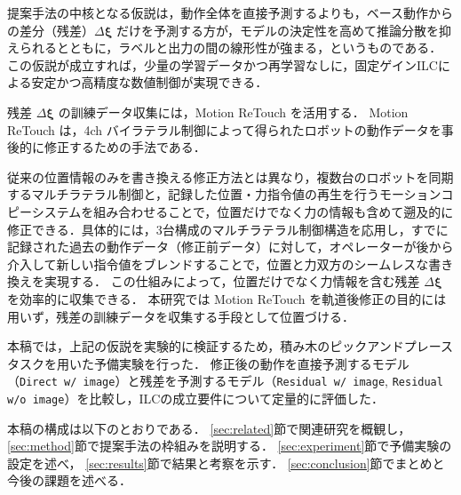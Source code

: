 提案手法の中核となる仮説は，動作全体を直接予測するよりも，ベース動作からの差分（残差）$\Delta\bm{\xi}$ だけを予測する方が，モデルの決定性を高めて推論分散を抑えられるとともに，ラベルと出力の間の線形性が強まる，というものである．
この仮説が成立すれば，少量の学習データかつ再学習なしに，固定ゲインILCによる安定かつ高精度な数値制御が実現できる．

残差 $\Delta\bm{\xi}$ の訓練データ収集には，Motion ReTouch \cite{Inami2025} を活用する．
Motion ReTouch は，4ch バイラテラル制御によって得られたロボットの動作データを事後的に修正するための手法である．

従来の位置情報のみを書き換える修正方法とは異なり，複数台のロボットを同期するマルチラテラル制御と，記録した位置・力指令値の再生を行うモーションコピーシステムを組み合わせることで，位置だけでなく力の情報も含めて遡及的に修正できる．具体的には，3台構成のマルチラテラル制御構造を応用し，すでに記録された過去の動作データ（修正前データ）に対して，オペレーターが後から介入して新しい指令値をブレンドすることで，位置と力双方のシームレスな書き換えを実現する．
この仕組みによって，位置だけでなく力情報を含む残差 $\Delta\bm{\xi}$ を効率的に収集できる．
本研究では Motion ReTouch を軌道後修正の目的には用いず，残差の訓練データを収集する手段として位置づける．

本稿では，上記の仮説を実験的に検証するため，積み木のピックアンドプレースタスクを用いた予備実験を行った．
修正後の動作を直接予測するモデル（\texttt{Direct w/ image}）と残差を予測するモデル（\texttt{Residual w/ image}, \texttt{Residual w/o image}）を比較し，ILCの成立要件について定量的に評価した．

本稿の構成は以下のとおりである．
\ref{sec:related}節で関連研究を概観し，
\ref{sec:method}節で提案手法の枠組みを説明する．
\ref{sec:experiment}節で予備実験の設定を述べ，
\ref{sec:results}節で結果と考察を示す．
\ref{sec:conclusion}節でまとめと今後の課題を述べる．
